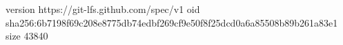 version https://git-lfs.github.com/spec/v1
oid sha256:6b7198f69c208e8775db74edbf269cf9e50f8f25dcd0a6a85508b89b261a83e1
size 43840
